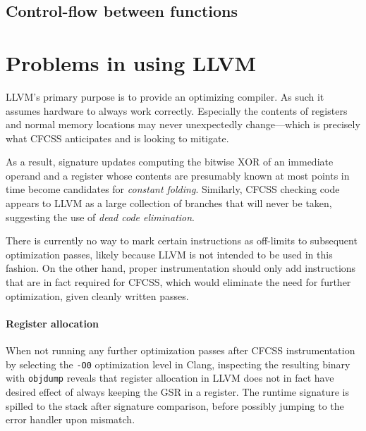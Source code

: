\subsection{Control-flow between functions}



\section{Problems in using LLVM}

LLVM's primary purpose is to provide an optimizing compiler. As such it assumes
hardware to always work correctly. Especially the contents of registers and
normal memory locations may never unexpectedly change—which is precisely what
CFCSS anticipates and is looking to mitigate.

As a result, signature updates computing the bitwise XOR of an immediate
operand and a register whose contents are presumably known at most points in
time become candidates for \emph{constant folding}. Similarly, CFCSS checking
code appears to LLVM as a large collection of branches that will never be
taken, suggesting the use of \emph{dead code elimination}.

There is currently no way to mark certain instructions as off-limits to
subsequent optimization passes, likely because LLVM is not intended to be used
in this fashion. On the other hand, proper instrumentation should only add
instructions that are in fact required for CFCSS, which would eliminate the
need for further optimization, given cleanly written passes.



\paragraph{Register allocation}

When not running any further optimization passes after CFCSS instrumentation by
selecting the \texttt{-O0} optimization level in Clang, inspecting the
resulting binary with \texttt{objdump} reveals that register allocation in LLVM
does not in fact have desired effect of always keeping the GSR in a register.
The runtime signature is spilled to the stack after signature comparison,
before possibly jumping to the error handler upon mismatch.

